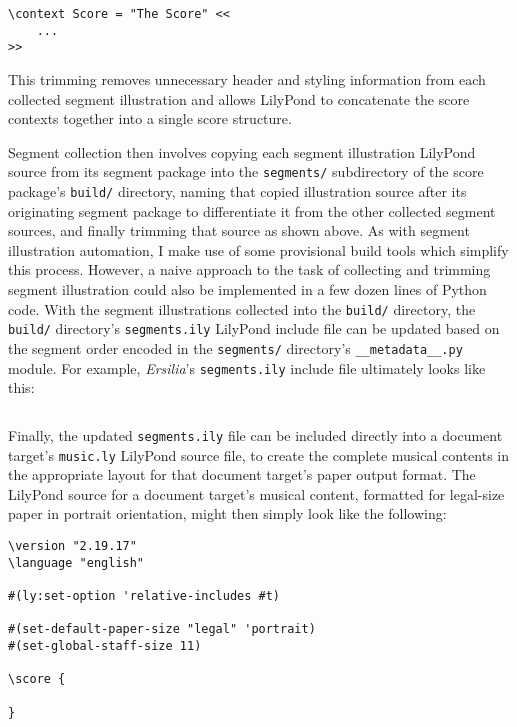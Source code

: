 \begin{singlespacing}
\vspace{-0.5\baselineskip}
\begin{verbatim}
\context Score = "The Score" <<
    ...
>>
\end{verbatim}
\end{singlespacing}

\noindent This trimming removes unnecessary header and styling information from
each collected segment illustration and allows LilyPond to concatenate the
score contexts together into a single score structure.

Segment collection then involves copying each segment illustration LilyPond
source from its segment package into the \texttt{segments/} subdirectory of the
score package's \texttt{build/} directory, naming that copied illustration
source after its originating segment package to differentiate it from the other
collected segment sources, and finally trimming that source as shown above. As
with segment illustration automation, I make use of some provisional build
tools which simplify this process. However, a naive approach to the task of
collecting and trimming segment illustration could also be implemented in a few
dozen lines of Python code. With the segment illustrations collected into the
\texttt{build/} directory, the \texttt{build/} directory's
\texttt{segments.ily} LilyPond include file can be updated based on the segment
order encoded in the \texttt{segments/} directory's
\texttt{\_\_metadata\_\_.py} module. For example, \emph{Ersilia}'s
\texttt{segments.ily} include file ultimately looks like this:

\begin{singlespacing}
\vspace{-0.5\baselineskip}
\inputminted{tex}{../../Documents/Scores/ersilia/ersilia/build/segments.ily}
\end{singlespacing}

\noindent Finally, the updated \texttt{segments.ily} file can be included
directly into a document target's \texttt{music.ly} LilyPond source file, to
create the complete musical contents in the appropriate layout for that
document target's paper output format. The LilyPond source for a document
target's musical content, formatted for legal-size paper in portrait
orientation, might then simply look like the following:

\begin{singlespacing}
\vspace{-0.5\baselineskip}
\begin{verbatim}
\version "2.19.17"
\language "english"

#(ly:set-option 'relative-includes #t)

#(set-default-paper-size "legal" 'portrait)
#(set-global-staff-size 11)

\score {
    
}
\end{verbatim}
\end{singlespacing}

